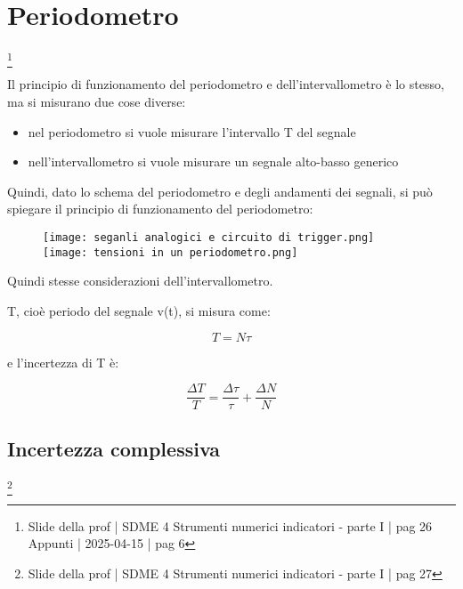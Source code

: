 \newpage 

\section{Periodometro}
\footnote{Slide della prof | SDME 4 Strumenti numerici indicatori - parte I | pag 26 \\  
Appunti | 2025-04-15 | pag 6}

Il principio di funzionamento del periodometro e dell'intervallometro è lo stesso, 
ma si misurano due cose diverse: 

\begin{itemize}
    \item nel periodometro si vuole misurare l'intervallo T del segnale 
    \item nell'intervallometro si vuole misurare un segnale alto-basso generico
\end{itemize}

Quindi, dato lo schema del periodometro e degli andamenti dei segnali, si può spiegare il principio di funzionamento del periodometro: 

\begin{figure}[h]
    \centering
    \texttt{[image: seganli analogici e circuito di trigger.png]}
    \texttt{[image: tensioni in un periodometro.png]}
\end{figure}

Quindi stesse considerazioni dell'intervallometro. \newline 

T, cioè periodo del segnale v(t), si misura come: 

{
    \Large 
    \begin{equation}
        T = N \tau
    \end{equation}
}

e l'incertezza di T è: 

{
    \Large 
    \begin{equation}
        \frac{\Delta T}{T} 
        = 
        \frac{\Delta \tau}{\tau}
        +
        \frac{\Delta N}{N}
    \end{equation}
}

\newpage 

\subsection{Incertezza complessiva}
\footnote{Slide della prof | SDME 4 Strumenti numerici indicatori - parte I | pag 27}

